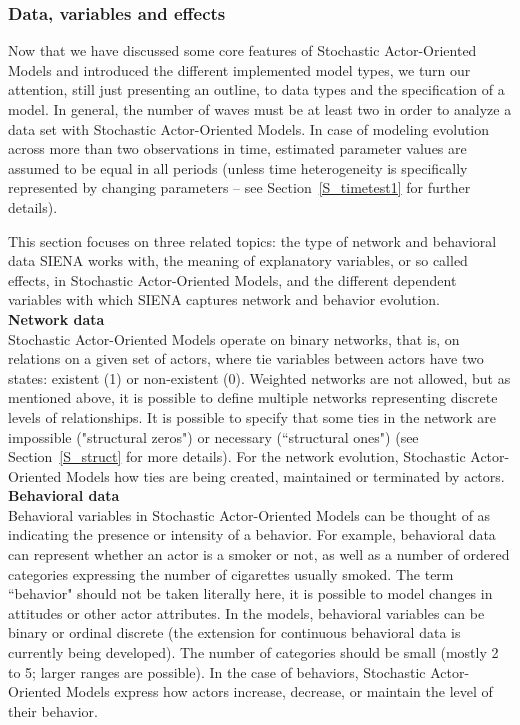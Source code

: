\documentclass[a4paper,fleqn,11pt]{article}
\newcommand{\+}{\, + \,}
\newcommand{\SI}{{\sf SIENA }}
\newcommand{\saom}{{Stochastic Actor-Oriented Model}}
\begin{document}
\subsubsection{Data, variables and effects}
\label{S_datvareff}

Now that we have discussed some core features of {\saom}s and introduced
the different implemented model types,
we turn our attention, still just presenting an outline, to
data types and the specification of a model. In general, the
number of waves must be at least two in order to analyze a
data set with {\saom}s. In case of modeling
 evolution across more than two observations in time, estimated
parameter values are assumed to be equal in all periods (unless time
heterogeneity is specifically represented by changing parameters --
see Section~\ref{S_timetest1} for further details).

This section focuses on three related topics: the type of network and
behavioral data \SI works with, the meaning of explanatory variables,
or so called effects, in {\saom}s, and the
different dependent variables with which \SI captures network and
behavior evolution.\\

\noindent
\textbf{Network data}\\

{\saom}s operate on binary networks,
that is, on relations on a given set of actors,
where tie variables between actors have two states:
existent (1) or non-existent (0).
Weighted networks are not allowed, but as mentioned above, it is
possible to define multiple networks representing discrete levels
of relationships. It is possible to specify that some ties in the
network are impossible ("structural zeros") or necessary (``structural ones")
(see Section~\ref{S_struct} for more details).
For the network evolution, {\saom}s how ties
are being created, maintained or terminated by actors.\\

\noindent
\textbf{Behavioral data}\\

Behavioral variables in {\saom}s can be
thought of as indicating the presence or intensity of a behavior.
For example, behavioral data can represent whether an actor is a
smoker or not, as well as a number of ordered categories
expressing the number of cigarettes usually smoked.
The term ``behavior" should not be taken literally here, it is
possible to model changes in attitudes or other actor attributes.
In the models, behavioral variables can be binary or ordinal discrete
(the extension for continuous behavioral data is currently being
developed). The number of categories should be small
(mostly 2 to 5; larger ranges are possible).
In the case of behaviors, {\saom}s express
how actors increase, decrease, or maintain the level of their behavior.\\
\end{document}
